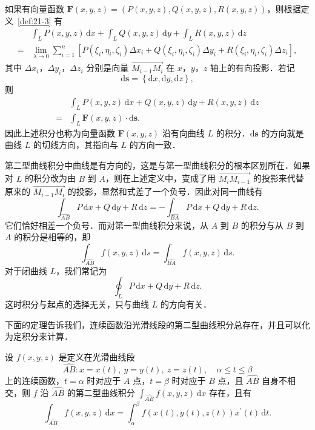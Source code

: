 如果有向量函数 $\bm{F}(x,y,z)=\left(P(x,y,z),Q(x,y,z),R(x,y,z)\right)$，则根据定义~\ref{def:21-3} 有
\[
\begin{aligned}
&\int_{L}P(x,y,z)\,\mathrm{d}x+\int_{L}Q(x,y,z)\,\mathrm{d}y+\int_{L}R(x,y,z)\,\mathrm{d}z\\
={}&\lim_{\lambda\to0}\sum_{i=1}^{n}\left[P(\xi_{i},\eta_{i},\zeta_{i})\Delta x_{i}+Q(\xi_{i},\eta_{i},\zeta_{i})\Delta y_{i}+R(\xi_{i},\eta_{i},\zeta_{i})\Delta z_{i}\right],
\end{aligned}
\]
其中 $\Delta x_{i}$，$\Delta y_{i}$，$\Delta z_{i}$ 分别是向量 $\overrightarrow{M_{i-1}M_{i}}$ 在 $x$，$y$，$z$ 轴上的有向投影．若记
\[
\mathrm{d}\bm{s}=\left\{\mathrm{d}x,\mathrm{d}y,\mathrm{d}z\right\},
\]
则
\[
\begin{aligned}
&\int_{L}P(x,y,z)\,\mathrm{d}x+Q(x,y,z)\,\mathrm{d}y+R(x,y,z)\,\mathrm{d}z\\
={}&\int_{L}\bm{F}(x,y,z)\cdot\mathrm{d}\bm{s}.
\end{aligned}
\]
因此上述积分也称为向量函数 $\bm{F}(x,y,z)$ 沿有向曲线 $L$ 的积分．$\mathrm{d}\bm{s}$ 的方向就是曲线 $L$ 的切线方向，其指向与 $L$ 的方向一致．

第二型曲线积分中曲线是有方向的，这是与第一型曲线积分的根本区别所在．如果对 $L$ 的积分改为由 $B$ 到 $A$，则在上述定义中，变成了用 $\overrightarrow{M_{i}M_{i-1}}$ 的投影来代替原来的 $\overrightarrow{M_{i-1}M_{i}}$ 的投影，显然和式差了一个负号．因此对同一曲线有
\[
\int_{\widehat{AB}}P\,\mathrm{d}x+Q\,\mathrm{d}y+R\,\mathrm{d}z=-\int_{\widehat{BA}}P\,\mathrm{d}x+Q\,\mathrm{d}y+R\,\mathrm{d}z.
\]
它们恰好相差一个负号．而对第一型曲线积分来说，从 $A$ 到 $B$ 的积分与从 $B$ 到 $A$ 的积分是相等的，即
\[
\int_{\widehat{AB}}f(x,y,z)\,\mathrm{d}s=\int_{\widehat{BA}}f(x,y,z)\,\mathrm{d}s.
\]
对于闭曲线 $L$，我们常记为
\[
\oint_{L}P\,\mathrm{d}x+Q\,\mathrm{d}y+R\,\mathrm{d}z.
\]
这时积分与起点的选择无关，只与曲线 $L$ 的方向有关．

下面的定理告诉我们，连续函数沿光滑线段的第二型曲线积分总存在，并且可以化为定积分来计算．

\begin{theorem}\label{thm:21-3}
设 $f(x,y,z)$ 是定义在光滑曲线段
\[
\widehat{AB}:x=x(t),\ y=y(t),\ z=z(t),\quad\alpha\leqslant t\leqslant\beta
\]
上的连续函数，$t=\alpha$ 时对应于 $A$ 点，$t=\beta$ 时对应于 $B$ 点，且 $\widehat{AB}$ 自身不相交，则 $f$ 沿 $\widehat{AB}$ 的第二型曲线积分 $\displaystyle\int_{\widehat{AB}}f(x,y,z)\,\mathrm{d}x$ 存在，且有
\[
\int_{\widehat{AB}}f(x,y,z)\,\mathrm{d}x=\int_{\alpha}^{\beta}f(x(t),y(t),z(t))x^{\prime}(t)\,\mathrm{d}t.
\]
\end{theorem}

